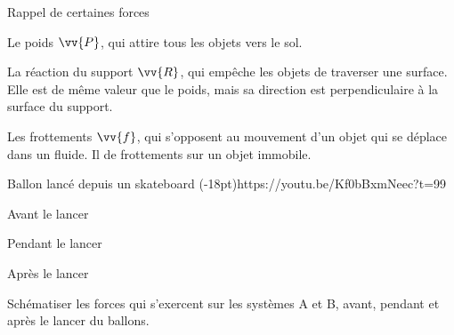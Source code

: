\begin{doc}{Rappel de certaines forces}
  \begin{listePoints}
    \item Le poids $\vv{P}$, qui attire tous les objets vers le sol.
    \item La réaction du support $\vv{R}$, qui empêche les objets de traverser une surface.
    Elle est de même valeur que le poids, mais sa direction est perpendiculaire à la surface du support.
    \item Les frottements $\vv{f}$, qui s'opposent au mouvement d'un objet qui se déplace dans un fluide.
    Il  de frottements sur un objet immobile.
  \end{listePoints}
\end{doc}


\begin{doc}{Ballon lancé depuis un skateboard}
  \qrcode(-18pt){https://youtu.be/Kf0bBxmNeec?t=99}
  \begin{multicols}{3}
    \centering
    
    Avant le lancer
    

    Pendant le lancer
    

    Après le lancer
  \end{multicols}
\end{doc}





\schematisation Schématiser les forces qui s'exercent sur les systèmes A et B, avant, pendant et après le lancer du ballons. 